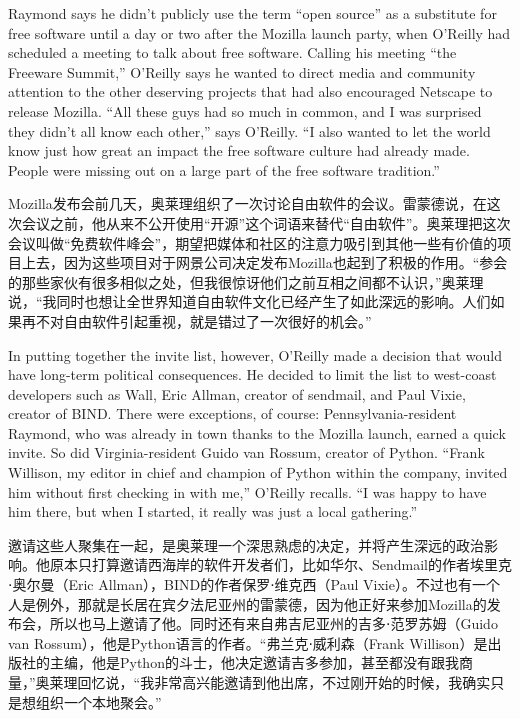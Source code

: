 \ifdefined\eng
Raymond says he didn't publicly use the term ``open source'' as a substitute for free software until a day or two after the Mozilla launch party, when O'Reilly had scheduled a meeting to talk about free software. Calling his meeting ``the Freeware Summit,'' O'Reilly says he wanted to direct media and community attention to the other deserving projects that had also encouraged Netscape to release Mozilla. ``All these guys had so much in common, and I was surprised they didn't all know each other,'' says O'Reilly. ``I also wanted to let the world know just how great an impact the free software culture had already made. People were missing out on a large part of the free software tradition.''
\fi

\ifdefined\chs
Mozilla发布会前几天，奥莱理组织了一次讨论自由软件的会议。雷蒙德说，在这次会议之前，他从来不公开使用``开源''这个词语来替代``自由软件''。奥莱理把这次会议叫做``免费软件峰会''，期望把媒体和社区的注意力吸引到其他一些有价值的项目上去，因为这些项目对于网景公司决定发布Mozilla也起到了积极的作用。``参会的那些家伙有很多相似之处，但我很惊讶他们之前互相之间都不认识，''奥莱理说，``我同时也想让全世界知道自由软件文化已经产生了如此深远的影响。人们如果再不对自由软件引起重视，就是错过了一次很好的机会。''
\fi

\ifdefined\eng
In putting together the invite list, however, O'Reilly made a decision that would have long-term political consequences. He decided to limit the list to west-coast developers such as Wall, Eric Allman, creator of sendmail, and Paul Vixie, creator of BIND. There were exceptions, of course: Pennsylvania-resident Raymond, who was already in town thanks to the Mozilla launch, earned a quick invite. So did Virginia-resident Guido van Rossum, creator of Python. ``Frank Willison, my editor in chief and champion of Python within the company, invited him without first checking in with me,'' O'Reilly recalls. ``I was happy to have him there, but when I started, it really was just a local gathering.''
\fi

\ifdefined\chs
邀请这些人聚集在一起，是奥莱理一个深思熟虑的决定，并将产生深远的政治影响。他原本只打算邀请西海岸的软件开发者们，比如华尔、Sendmail的作者埃里克⋅奥尔曼（Eric Allman），BIND的作者保罗⋅维克西（Paul Vixie）。不过也有一个人是例外，那就是长居在宾夕法尼亚州的雷蒙德，因为他正好来参加Mozilla的发布会，所以也马上邀请了他。同时还有来自弗吉尼亚州的吉多⋅范罗苏姆（Guido van Rossum），他是Python语言的作者。``弗兰克⋅威利森（Frank Willison）是出版社的主编，他是Python的斗士，他决定邀请吉多参加，甚至都没有跟我商量，''奥莱理回忆说，``我非常高兴能邀请到他出席，不过刚开始的时候，我确实只是想组织一个本地聚会。''
\fi

